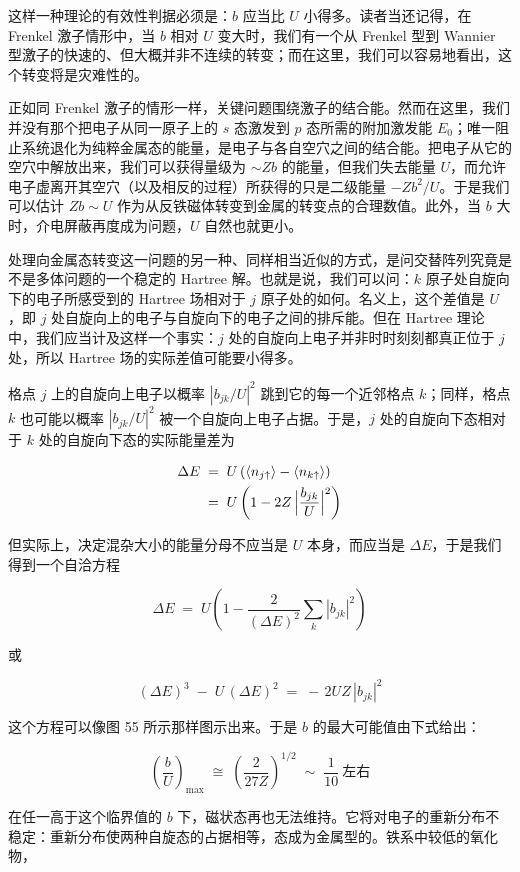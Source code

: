 这样一种理论的有效性判据必须是：$b$ 应当比 $U$ 小得多。读者当还记得，在 Frenkel 激子情形中，当 $b$ 相对 $U$ 变大时，我们有一个从 Frenkel 型到 Wannier 型激子的快速的、但大概并非不连续的转变；而在这里，我们可以容易地看出，这个转变将是灾难性的。

正如同 Frenkel 激子的情形一样，关键问题围绕激子的结合能。然而在这里，我们并没有那个把电子从同一原子上的 $s$ 态激发到 $p$ 态所需的附加激发能 $E_0$；唯一阻止系统退化为纯粹金属态的能量，是电子与各自空穴之间的结合能。把电子从它的空穴中解放出来，我们可以获得量级为 $\sim Zb$ 的能量，但我们失去能量 $U$，而允许电子虚离开其空穴（以及相反的过程）所获得的只是二级能量 $-Zb^{2}/U$。于是我们可以估计 $Zb \sim U$ 作为从反铁磁体转变到金属的转变点的合理数值。此外，当 $b$ 大时，介电屏蔽再度成为问题，$U$ 自然也就更小。

处理向金属态转变这一问题的另一种、同样相当近似的方式，是问交替阵列究竟是不是多体问题的一个稳定的 Hartree 解。也就是说，我们可以问：$k$ 原子处自旋向下的电子所感受到的 Hartree 场相对于 $j$ 原子处的如何。名义上，这个差值是 $U$，即 $j$ 处自旋向上的电子与自旋向下的电子之间的排斥能。但在 Hartree 理论中，我们应当计及这样一个事实：$j$ 处的自旋向上电子并非时时刻刻都真正位于 $j$ 处，所以 Hartree 场的实际差值可能要小得多。

格点 $j$ 上的自旋向上电子以概率 $|b_{jk}/U|^{2}$ 跳到它的每一个近邻格点 $k$；同样，格点 $k$ 也可能以概率 $|b_{jk}/U|^{2}$ 被一个自旋向上电子占据。于是，$j$ 处的自旋向下态相对于 $k$ 处的自旋向下态的实际能量差为

\begin{align*}
\Delta E \;&=\; U\left(\langle n_{j\uparrow}\rangle - \langle n_{k\uparrow}\rangle\right) \\
&=\; U\left(1 - 2Z\,\Bigl|\frac{b_{jk}}{U}\Bigr|^{2}\right)
\end{align*}

但实际上，决定混杂大小的能量分母不应当是 $U$ 本身，而应当是 $\Delta E$，于是我们得到一个自洽方程

\begin{equation*}
\Delta E \;=\; U\left(1 - \frac{2}{(\Delta E)^{2}} \sum_{k} |b_{jk}|^{2}\right)
\end{equation*}

或

\begin{equation*}
(\Delta E)^{3} \;-\; U\,(\Delta E)^{2} \;=\; -\,2UZ\,|b_{jk}|^{2}
\end{equation*}

这个方程可以像图 55 所示那样图示出来。于是 $b$ 的最大可能值由下式给出：

\begin{equation*}
\left(\frac{b}{U}\right)_{\max} \;\cong\; \left(\frac{2}{27Z}\right)^{1/2} \;\sim\; \frac{1}{10}\ \text{左右}
\end{equation*}

在任一高于这个临界值的 $b$ 下，磁状态再也无法维持。它将对电子的重新分布不稳定：重新分布使两种自旋态的占据相等，态成为金属型的。铁系中较低的氧化物，

